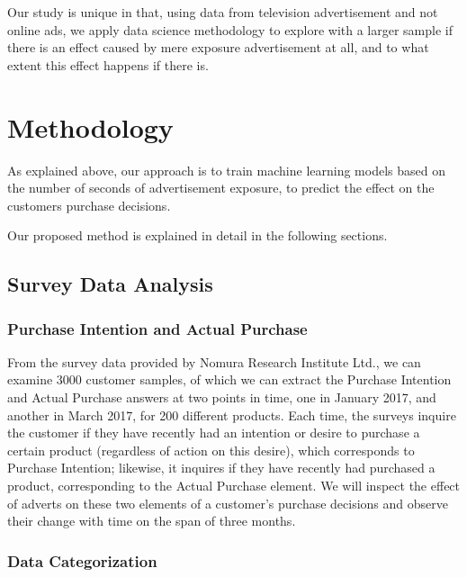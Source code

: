 \documentclass[review]{elsarticle}
\begin{document}
Our study is unique in that, using data from television advertisement and not online ads, we apply data science methodology to explore with a larger sample if there is an effect caused by mere exposure advertisement at all, and to what extent this effect happens if there is.

\section{Methodology}
\label{method}

As explained above, our approach is to train machine learning models based on the number of seconds of advertisement exposure, to predict the effect on the customers purchase decisions. 

Our proposed method is explained in detail in the following sections.

\subsection{Survey Data Analysis}
\label{survey_data_analysis}

\subsubsection{Purchase Intention and Actual Purchase}
\label{pi_and_ap}

From the survey data provided by Nomura Research Institute Ltd., we can examine 3000 customer samples, of which we can extract the Purchase Intention and Actual Purchase answers at two points in time, one in January 2017, and another in March 2017, for 200 different products. Each time, the surveys inquire the customer if they have recently had an intention or desire to purchase a certain product (regardless of action on this desire), which corresponds to Purchase Intention; likewise, it inquires if they have recently had purchased a product, corresponding to the Actual Purchase element. We will inspect the effect of adverts on these two elements of a customer's purchase decisions and observe their change with time on the span of three months.

\subsubsection{Data Categorization}
\label{data_cat}
\end{document}
